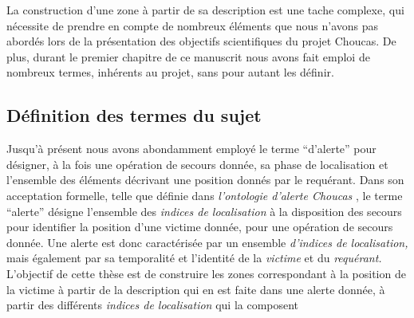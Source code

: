 La construction d'une zone à partir de sa description est une tache
complexe, qui nécessite de prendre en compte de nombreux éléments que
nous n'avons pas abordés lors de la présentation des objectifs
scientifiques du projet Choucas. De plus, durant le premier chapitre
de ce manuscrit nous avons fait emploi de nombreux termes, inhérents
au projet, sans pour autant les définir.

\subsection{Définition des termes du sujet}
\label{subsec:2-1}

Jusqu'à présent nous avons abondamment employé le terme
\enquote{d'alerte} pour désigner, à la fois une opération de secours
donnée, sa phase de localisation et l'ensemble des éléments décrivant
une position donnés par le requérant. Dans son acceptation formelle,
\ie telle que définie dans \emph{l’ontologie d'alerte Choucas}
\autocite[\ac{oac},][]{Viry2019}, le terme \enquote{alerte} désigne
l'ensemble des \emph{indices de localisation} à la disposition des
secours pour identifier la position d'une victime donnée, pour une
opération de secours donnée. Une alerte est donc caractérisée par un
ensemble \emph{d'indices de localisation,} mais également par sa
temporalité et l'identité de la \emph{victime} et du \emph{requérant.}
L'objectif de cette thèse est de construire les zones correspondant à
la position de la victime à partir de la description qui en est faite
dans une alerte donnée, \ie à partir des différents \emph{indices de
  localisation} qui la composent

